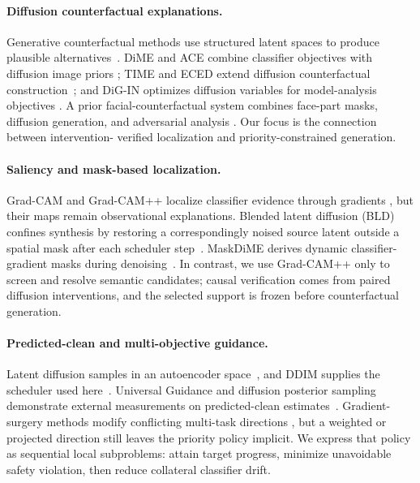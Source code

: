 \documentclass[10pt,twocolumn]{article}
\newcommand{\bld}{\textsc{BLD}}
\begin{document}
\paragraph{Diffusion counterfactual explanations.}
Generative counterfactual methods use structured latent spaces to produce
plausible alternatives~\cite{rodriguez2021dive,jacob2022steex}. DiME and ACE
combine classifier objectives with diffusion image priors
\cite{jeanneret2022dime,jeanneret2023ace}; TIME and ECED extend diffusion
counterfactual construction~\cite{jeanneret2024time,luu2025eced}; and DiG-IN
optimizes diffusion variables for model-analysis objectives
\cite{augustin2024digin}. A prior facial-counterfactual system combines
face-part masks, diffusion generation, and adversarial analysis
\cite{vohoang2026human}. Our focus is the connection between intervention-
verified localization and priority-constrained generation.

\paragraph{Saliency and mask-based localization.}
Grad-CAM and Grad-CAM++ localize classifier evidence through gradients
\cite{selvaraju2017gradcam,chattopadhyay2018gradcampp}, but their maps remain
observational explanations. Blended latent diffusion (\bld) confines synthesis
by restoring a correspondingly noised source latent outside a spatial mask
after each scheduler step~\cite{avrahami2022blended}. MaskDiME derives dynamic
classifier-gradient masks during denoising~\cite{guo2026maskdime}. In contrast,
we use Grad-CAM++ only to screen and resolve semantic candidates; causal
verification comes from paired diffusion interventions, and the selected
support is frozen before counterfactual generation.

\paragraph{Predicted-clean and multi-objective guidance.}
Latent diffusion samples in an autoencoder space~\cite{rombach2022latent}, and
DDIM supplies the scheduler used here~\cite{song2021ddim}. Universal Guidance
and diffusion posterior sampling demonstrate external measurements on
predicted-clean estimates~\cite{bansal2023universal,chung2023dps}. Gradient-
surgery methods modify conflicting multi-task directions
\cite{yu2020pcgrad}, but a weighted or projected direction still leaves the
priority policy implicit. We express that policy as sequential local
subproblems: attain target progress, minimize unavoidable safety violation,
then reduce collateral classifier drift.
\end{document}
